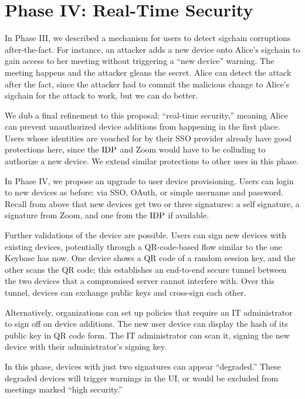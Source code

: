\section{Phase IV: Real-Time Security}

In Phase III, we described a mechanism for users to detect sigchain corruptions after-the-fact. For instance, an attacker adds a new device onto Alice's sigchain to gain access to her meeting without triggering a ``new device'' warning. The meeting happens and the attacker gleans the secret. Alice can detect the attack after the fact, since the attacker had to commit the malicious change to Alice's sigchain for the attack to work, but we can do better.

We dub a final refinement to this proposal: ``real-time security,'' meaning Alice can prevent unauthorized device additions from happening in the first place. Users whose identities are vouched for by their SSO provider already have good protections here, since the $\mathrm{IDP}$ and Zoom would have to be colluding to authorize a new device. We extend similar protections to other uses in this phase.

In Phase IV, we propose an upgrade to user device provisioning. Users can login to new devices as before: via SSO, OAuth, or simple username and password. Recall from above that new devices get two or three signatures: a self signature, a signature from Zoom, and one from the $\mathrm{IDP}$ if available.

Further validations of the device are possible. Users can sign new devices with existing devices, potentially through a QR-code-based flow similar to the one Keybase has now. One device shows a QR code of a random session key, and the other scans the QR code; this establishes an end-to-end secure tunnel between the two devices that a compromised server cannot interfere with. Over this tunnel, devices can exchange public keys and cross-sign each other.

Alternatively, organizations can set up policies that require an IT administrator to sign off on device additions. The new user device can display the hash of its public key in QR code form. The IT administrator can scan it, signing the new device with their administrator's signing key.

In this phase, devices with just two signatures can appear ``degraded.'' These degraded devices will trigger warnings in the UI, or would be excluded from meetings marked ``high security.''